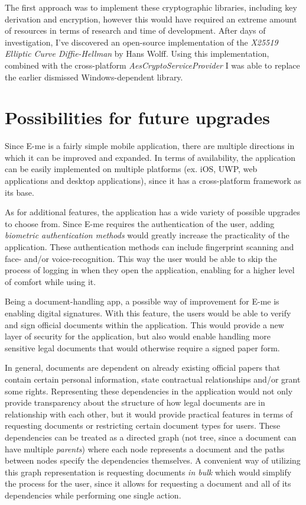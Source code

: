 The first approach was to implement these cryptographic libraries, including key derivation and encryption, however this would have 
required an extreme amount of resources in terms of research and time of development.
After days of investigation, I've discovered an open-source implementation of the \emph{X25519 Elliptic Curve Diffie-Hellman} by Hans Wolff.
Using this implementation, combined with the cross-platform \emph{AesCryptoServiceProvider} I was able to replace the earlier dismissed Windows-dependent
library. 

\section{Possibilities for future upgrades}

Since E-me is a fairly simple mobile application, there are multiple directions in which it can be improved and expanded.
In terms of availability, the application can be easily implemented on multiple platforms (ex. iOS, UWP, web applications and desktop applications), since it
has a cross-platform framework as its base.

As for additional features, the application has a wide variety of possible upgrades to choose from.
Since E-me requires the authentication of the user, adding \emph{biometric authentication methods} would greatly increase the practicality of
the application.
These authentication methods can include fingerprint scanning and face- and/or voice-recognition.
This way the user would be able to skip the process of logging in when they open the application, enabling for a higher level of comfort while using it.

Being a document-handling app, a possible way of improvement for E-me is enabling digital signatures.
With this feature, the users would be able to verify and sign official documents within the application.
This would provide a new layer of security for the application, but also would enable handling more sensitive legal documents that would otherwise 
require a signed paper form.

In general, documents are dependent on already existing official papers that contain certain personal information, state contractual
relationships and/or grant some rights.
Representing these dependencies in the application would not only provide transparency about the structure of how legal documents are in relationship
with each other, but it would provide practical features in terms of requesting documents or restricting certain document types for users.
These dependencies can be treated as a directed graph (not tree, since a document can have multiple \emph{parents}) where each node represents a document and the paths
between nodes specify the dependencies themselves.
A convenient way of utilizing this graph representation is requesting documents \emph{in bulk} which would simplify the process for the user, since
it allows for requesting a document and all of its dependencies while performing one single action.


